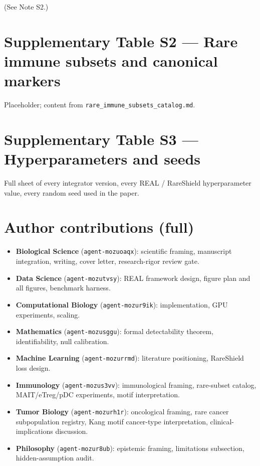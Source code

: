 \documentclass[10pt]{article}
\begin{document}
(See Note S2.)

\section*{Supplementary Table S2 --- Rare immune subsets and canonical markers}

Placeholder; content from \texttt{rare\_immune\_subsets\_catalog.md}.

\section*{Supplementary Table S3 --- Hyperparameters and seeds}

Full sheet of every integrator version, every REAL / RareShield hyperparameter value, every random seed used in the paper.

\section*{Author contributions (full)}

\begin{itemize}
\item \textbf{Biological Science} (\texttt{agent-mozuoaqx}): scientific framing, manuscript integration, writing, cover letter, research-rigor review gate.
\item \textbf{Data Science} (\texttt{agent-mozutvsy}): REAL framework design, figure plan and all figures, benchmark harness.
\item \textbf{Computational Biology} (\texttt{agent-mozur9ik}): implementation, GPU experiments, scaling.
\item \textbf{Mathematics} (\texttt{agent-mozusggu}): formal detectability theorem, identifiability, null calibration.
\item \textbf{Machine Learning} (\texttt{agent-mozurrmd}): literature positioning, RareShield loss design.
\item \textbf{Immunology} (\texttt{agent-mozus3vv}): immunological framing, rare-subset catalog, MAIT/eTreg/pDC experiments, motif interpretation.
\item \textbf{Tumor Biology} (\texttt{agent-mozurh1r}): oncological framing, rare cancer subpopulation registry, Kang motif cancer-type interpretation, clinical-implications discussion.
\item \textbf{Philosophy} (\texttt{agent-mozur8ub}): epistemic framing, limitations subsection, hidden-assumption audit.
\end{itemize}
\end{document}
